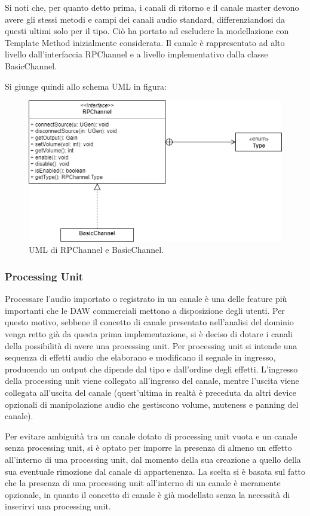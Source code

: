 \documentclass[a4paper,12pt]{report}
\begin{document}
Si noti che, per quanto detto prima, i canali di ritorno e il canale master devono avere gli stessi metodi e campi dei canali audio standard, differenziandosi da questi ultimi solo per il tipo. Ciò ha portato ad escludere la modellazione con Template Method inizialmente considerata. Il canale è rappresentato ad alto livello dall’interfaccia RPChannel e a livello implementativo dalla classe BasicChannel. 

Si giunge quindi allo schema UML in figura:

\begin{figure}[H]
\centering{}
\includegraphics[width=\textwidth,scale=1]{img/channel.png}
\caption{UML di RPChannel e BasicChannel.}
\end{figure}

\subsubsection{Processing Unit}
Processare l’audio importato o registrato in un canale è una delle feature più importanti che le DAW commerciali mettono a disposizione degli utenti. Per questo motivo, sebbene il concetto di canale presentato nell’analisi del dominio venga retto già da questa prima implementazione, si è deciso di dotare i canali della possibilità di avere una processing unit. Per processing unit si intende una sequenza di effetti audio che elaborano e modificano il segnale in ingresso, producendo un output che dipende dal tipo e dall’ordine degli effetti. 
L’ingresso della processing unit viene collegato all’ingresso del canale, mentre l’uscita viene collegata all’uscita del canale (quest’ultima in realtà è preceduta da altri device opzionali di manipolazione audio che gestiscono volume, muteness e panning del canale).

Per evitare ambiguità tra un canale dotato di processing unit vuota e un canale senza processing unit, si è optato per imporre la presenza di almeno un effetto all’interno di una processing unit, dal momento della sua creazione a quello della sua eventuale rimozione dal canale di appartenenza.
La scelta si è basata sul fatto che la presenza di una processing unit all’interno di un canale è meramente opzionale, in quanto il concetto di canale è già modellato senza la necessità di inserirvi una processing unit.
\end{document}
